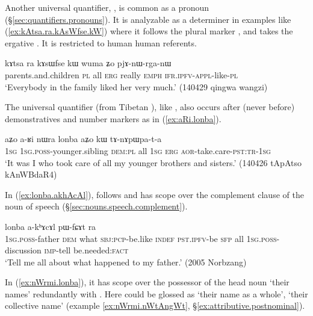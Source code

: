  Another universal quantifier,  , is common as a pronoun (§\ref{sec:quantifiers.pronouns}). It is analyzable as a determiner in examples like  (\ref{ex:kAtsa.ra.kAsWfse.kW}) where it follows the plural marker , and takes the ergative .  It is restricted to human human referents.
 
 \begin{exe}
\ex \label{ex:kAtsa.ra.kAsWfse.kW}
\gll  kɤtsa ra kɤsɯfse kɯ wuma ʑo pjɤ-nɯ-rga-nɯ  \\
parents.and.children \textsc{pl} all \textsc{erg} really \textsc{emph} \textsc{ifr}.\textsc{ipfv}-\textsc{appl}-like-\textsc{pl} \\
\glt `Everybody in the family liked her very much.' (140429 qingwa wangzi) 
  \end{exe}

The universal quantifier  (from Tibetan ), like , also occurs after (never before) demonstratives and number markers as in (\ref{ex:aRi.lonba}).

 \begin{exe}
\ex \label{ex:aRi.lonba}
 \gll aʑo a-ʁi nɯra lonba aʑo kɯ tɤ-nɤpɯpa-t-a \\
 \textsc{1sg} \textsc{1sg}.\textsc{poss}-younger.sibling \textsc{dem}:\textsc{pl} all \textsc{1sg} \textsc{erg} \textsc{aor}-take.care-\textsc{pst}:\textsc{tr}-\textsc{1sg} \\
 \glt `It was I who took care of all my younger brothers and sisters.' (140426 tApAtso kAnWBdaR4)
\end{exe}
 
In (\ref{ex:lonba.akhAcAl}),  follows and has scope over the complement clause of the noun of speech  (§\ref{sec:nouns.speech.complement}).

\begin{exe}
\ex \label{ex:lonba.akhAcAl}
  lonba a-kʰɤcɤl pɯ-fɕɤt ra \\
 \textsc{1sg}.\textsc{poss}-father \textsc{dem} what \textsc{sbj}:\textsc{pcp}-be.like \textsc{indef} \textsc{pst}.\textsc{ipfv}-be \textsc{sfp} all \textsc{1sg}.\textsc{poss}-discussion \textsc{imp}-tell be.needed:\textsc{fact} \\
\glt `Tell me all about what happened to my father.' (2005 Norbzang)
\end{exe}

In (\ref{ex:nWrmi.lonba}), it has scope over the possessor of the head noun  `their names' redundantly with . Here  could be glossed as  `their name as a whole', `their collective name' (example \ref{ex:nWrmi.nWtAngWt}, §\ref{ex:attributive.postnominal}).

